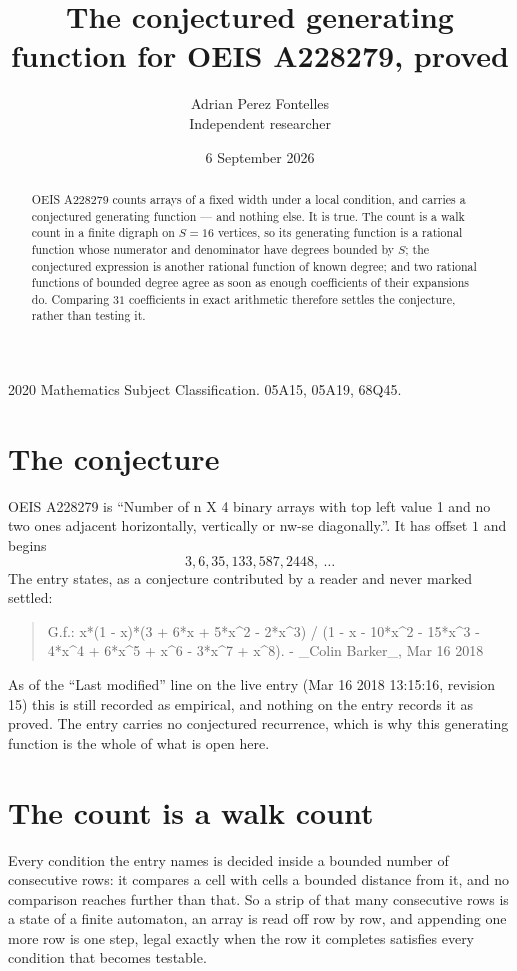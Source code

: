\documentclass[11pt,a4paper]{article}
\title{The conjectured generating function for OEIS A228279, proved}
\author{Adrian Perez Fontelles\\ \small Independent researcher}
\date{6 September 2026}
\theoremstyle{plain}
\theoremstyle{definition}
\begin{document}
\maketitle

\begin{abstract}
OEIS A228279 counts arrays of a fixed width under a local condition, and carries a conjectured
generating function --- and nothing else. It is true. The count is a walk count in a finite
digraph on $S=16$ vertices, so its generating function is a rational function whose numerator
and denominator have degrees bounded by $S$; the conjectured expression is another rational
function of known degree; and two rational functions of bounded degree agree as soon as enough
coefficients of their expansions do. Comparing $31$ coefficients in exact arithmetic
therefore settles the conjecture, rather than testing it.
\end{abstract}

\noindent\small 2020 Mathematics Subject Classification. 05A15, 05A19, 68Q45.\normalsize

\section{The conjecture}

OEIS A228279 is ``Number of n X 4 binary arrays with top left value 1 and no two ones adjacent horizontally, vertically or nw-se diagonally.''. It has offset $1$ and begins
\[
3, 6, 35, 133, 587, 2448,\ \dots
\]
The entry states, as a conjecture contributed by a reader and never marked settled:
\begin{quote}
G.f.: x*(1 - x)*(3 + 6*x + 5*x\^{}2 - 2*x\^{}3) / (1 - x - 10*x\^{}2 - 15*x\^{}3 - 4*x\^{}4 + 6*x\^{}5 + x\^{}6 - 3*x\^{}7 + x\^{}8). - \_Colin Barker\_, Mar 16 2018
\end{quote}
As of the ``Last modified'' line on the live entry (Mar 16 2018 13:15:16, revision 15) this is still
recorded as empirical, and nothing on the entry records it as proved. The entry carries no
conjectured recurrence, which is why this generating function is the whole of what is open
here.

\section{The count is a walk count}

Every condition the entry names is decided inside a bounded number of consecutive rows: it
compares a cell with cells a bounded distance from it, and no comparison reaches further than
that. So a strip of that many consecutive rows is a state of a finite automaton, an array is
read off row by row, and appending one more row is one step, legal exactly when the row it
completes satisfies every condition that becomes testable.
\end{document}
